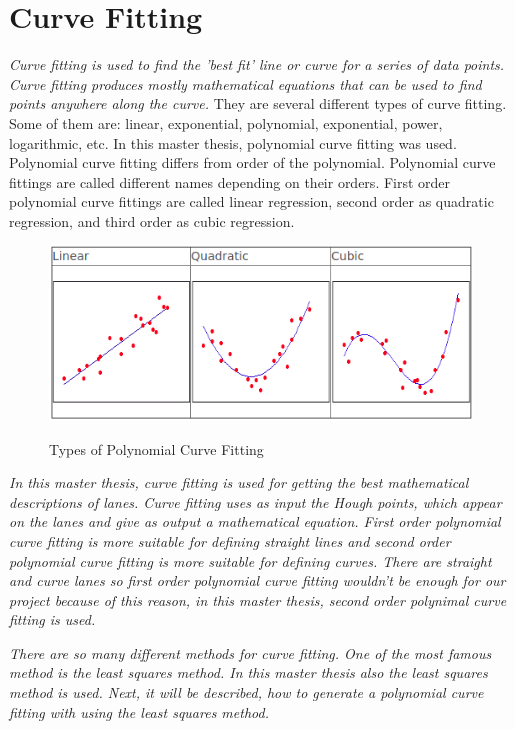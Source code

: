 %
\section{Curve Fitting}\label{sec:Curve Fitting}

\emph{\color{red}Curve fitting is used to find the 'best fit' line or curve for a series of data points. Curve fitting produces mostly mathematical equations that can be used to find points anywhere along
the curve.\cite{Curve_Fitting}} They are several different types of curve fitting. Some of them are: linear, exponential, polynomial, exponential, power, logarithmic, etc. In this master thesis, polynomial curve fitting was used. Polynomial curve fitting differs from order of the polynomial. Polynomial curve fittings are called different names depending on their orders. First order polynomial curve fittings are called linear regression, second order as quadratic regression, and third order as cubic regression.


\begin{figure}[H]
 \centering
  \includegraphics[width=1\textwidth]{./Bilder/Curve_Fitting_Polynomial.png}\label{Curve_Fitting_Polynomial}
  \caption{Types of Polynomial Curve Fitting\cite{Curve_Fitting_Polynomial}}
\end{figure}


\emph{\color{blue}In this master thesis, curve fitting is used for getting the best mathematical descriptions of lanes. Curve fitting uses as input the Hough points, which appear on the lanes and give as output a mathematical equation. First order polynomial curve fitting is more suitable for defining straight lines and second order polynomial curve fitting is more suitable for defining curves. There are straight and curve lanes so first order polynomial curve fitting wouldn't be enough for our project because of this reason, in this master thesis, second order polynimal curve fitting is used.}

\emph{\color{blue}There are so many different methods for curve fitting. One of the most famous method is the least squares method. In this master thesis also the least squares method is used. Next, it will be described, how to generate a polynomial curve fitting with using the least squares method.}

